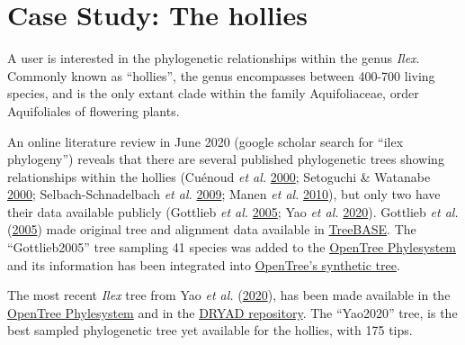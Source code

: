 \documentclass[]{article}
\begin{document}
\hypertarget{case-study-the-hollies}{%
\section{Case Study: The hollies}\label{case-study-the-hollies}}

A user is interested in the phylogenetic relationships within the genus \emph{Ilex}. Commonly known as ``hollies'', the genus encompasses between 400-700 living species, and is the only extant clade within the family Aquifoliaceae, order Aquifoliales of flowering plants.

An online literature review in June 2020 (google scholar search for ``ilex phylogeny'') reveals that there are several published phylogenetic trees showing relationships within the hollies (Cuénoud \emph{et al.} \protect\hyperlink{ref-cuenoud2000molecular}{2000}; Setoguchi \& Watanabe \protect\hyperlink{ref-setoguchi2000intersectional}{2000}; Selbach-Schnadelbach \emph{et al.} \protect\hyperlink{ref-selbach2009new}{2009}; Manen \emph{et al.} \protect\hyperlink{ref-manen2010history}{2010}), but only two have their data available publicly (Gottlieb \emph{et al.} \protect\hyperlink{ref-gottlieb2005molecular}{2005}; Yao \emph{et al.} \protect\hyperlink{ref-yao2020phylogeny}{2020}).
Gottlieb \emph{et al.} (\protect\hyperlink{ref-gottlieb2005molecular}{2005}) made original tree and alignment data available in \href{https://treebase.org/treebase-web/search/study/summary.html?id=1091}{TreeBASE}. The ``Gottlieb2005'' tree sampling 41 species was added to the \href{https://tree.opentreeoflife.org/curator/study/edit/pg_2827/?tab=home}{OpenTree Phylesystem} and its information has been integrated into \href{https://devtree.opentreeoflife.org/opentree/opentree12.3@mrcaott68451ott89474/Ilex-theizans--Ilex-dumosa}{OpenTree's synthetic tree}.

The most recent \emph{Ilex} tree from Yao \emph{et al.} (\protect\hyperlink{ref-yao2020phylogeny}{2020}), has been made available in the \href{https://tree.opentreeoflife.org/curator/study/view/ot_1984}{OpenTree Phylesystem} and in the \href{https://datadryad.org/stash/dataset/doi:10.5061/dryad.k0p2ngf4x}{DRYAD repository}. The ``Yao2020'' tree, is the best sampled phylogenetic tree yet available for the hollies, with 175 tips.
\end{document}
